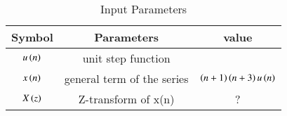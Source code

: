 \setlength{\arrayrulewidth}{0.2mm}
\setlength{\tabcolsep}{15pt}
\renewcommand{\arraystretch}{1.15}


\begin{table}[ht]
  \centering
  \begin{tabular}{|c|c|c|}
    \hline
    	Symbol & Parameters & value\\
    \hline
	  $u\left(n\right)$ & unit step function &  \\
    \hline
	  $x\left(n\right)$ & general term of the series & $\left(n+1\right)\left(n+3\right)u\left(n\right)$ \\
    \hline 
	 $X\left(z\right)$ & Z-transform of x(n) & ? \\
    \hline
  \end{tabular}
  \vspace{0.3cm}
  \caption{Input Parameters}
  \label{tab:1.11.9.1.1}
\end{table}
